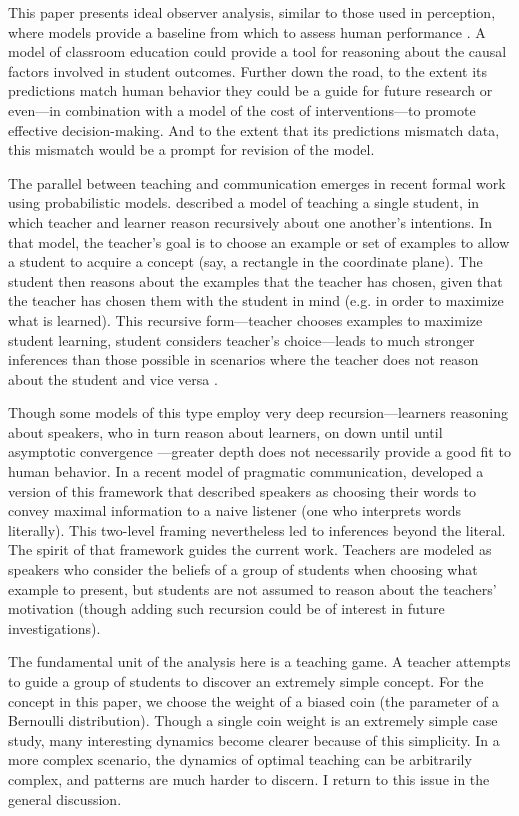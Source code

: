 \documentclass[10pt,letterpaper]{article}
\begin{document}
This paper presents ideal observer analysis, similar to those used in perception, where models provide a baseline from which to assess human performance \cite{geisler2003,frank2013}. A model of classroom education could provide a tool for reasoning about the causal factors involved in student outcomes. Further down the road, to the extent its predictions match human behavior they could be a guide for future research or even---in combination with a model of the cost of interventions---to promote effective decision-making. And to the extent that its predictions mismatch data, this mismatch would be a prompt for revision of the model.

The parallel between teaching and communication emerges in recent formal work using probabilistic models.  described a model of teaching a single student, in which teacher and learner reason recursively about one another's intentions. In that model, the teacher's goal is to choose an example or set of examples to allow a student to acquire a concept (say, a rectangle in the coordinate plane). The student then reasons about the examples that the teacher has chosen, given that the teacher has chosen them with the student in mind (e.g. in order to maximize what is learned). This recursive form---teacher chooses examples to maximize student learning, student considers teacher's choice---leads to much stronger inferences than those possible in scenarios where the teacher does not reason about the student and vice versa \cite{shafto2012}.

Though some models of this type employ very deep recursion---learners reasoning about speakers, who in turn reason about learners, on down until until asymptotic convergence \cite{jager2010}---greater depth does not necessarily provide a good fit to human behavior. In a recent model of pragmatic communication,  developed a version of this framework that described speakers as choosing their words to convey maximal information to a naive listener (one who interprets words literally). This two-level framing nevertheless led to inferences beyond the literal. The spirit of that framework guides the current work. Teachers are modeled as speakers who consider the beliefs of a group of students when choosing what example to present, but students are not assumed to reason about the teachers' motivation (though adding such recursion could be of interest in future investigations). 

The fundamental unit of the analysis here is a teaching game. A teacher attempts to guide a group of students to discover an extremely simple concept. For the concept in this paper, we choose the weight of a biased coin (the parameter of a Bernoulli distribution). Though a single coin weight is an extremely simple case study, many interesting dynamics become clearer because of this simplicity. In a more complex scenario, the dynamics of optimal teaching can be arbitrarily complex, and patterns are much harder to discern. I return to this issue in the general discussion.
\end{document}
